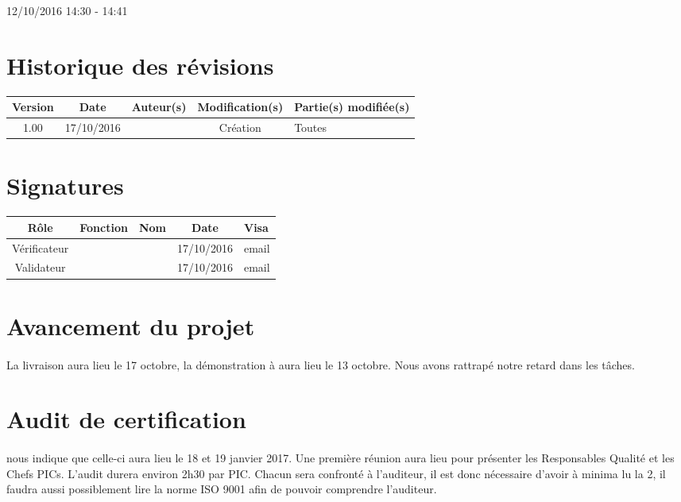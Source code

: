 \documentclass [a4paper] {article}
\begin{document}
\rhead{}

12/10/2016
\hfill   
\hfill 	14:30 - 14:41 				%



\section*{Historique des révisions}
\begin{center}
			\begin{tabular}{| c | c | c | c | p{4cm} |}
				\hline
				\rowcolor{Gray}
				Version & Date & Auteur(s) & Modification(s) & Partie(s) modifiée(s)		 \\
				\hline
				1.00 & 17/10/2016 & \Kafui & Création & Toutes \\
		\hline		
			\end{tabular}
		\end{center}

\section*{Signatures}

		\begin{center}
			\begin{tabular}{| c | c | c | c | p{4cm} |}
				\hline
				\rowcolor{Gray}
				Rôle & Fonction & Nom & Date & Visa		 \\
				\hline
				Vérificateur & \RGC & \Melissa & 17/10/2016 & email \\[30pt]
				\hline
				Validateur & \CP & \Pierre & 17/10/2016 & email \\[30pt]	
				\hline
			\end{tabular}
		\end{center}


\section{Avancement du projet}
\paragraph*{}
La livraison aura lieu le 17 octobre, la démonstration à \nomTuteurPedago{} aura lieu le 13 octobre. Nous avons rattrapé notre retard dans les tâches. 

\section{Audit de certification}
\paragraph*{}
\nomTuteurQualite{} nous indique que celle-ci aura lieu le 18 et 19 janvier 2017. Une première réunion aura lieu pour présenter les Responsables Qualité et les Chefs PICs. L'audit durera environ 2h30 par PIC.
Chacun sera confronté à l'auditeur, il est donc nécessaire d'avoir à minima lu la \DGQ{} 2, il faudra aussi possiblement lire la norme ISO 9001 afin de pouvoir comprendre l'auditeur.
\end{document}
